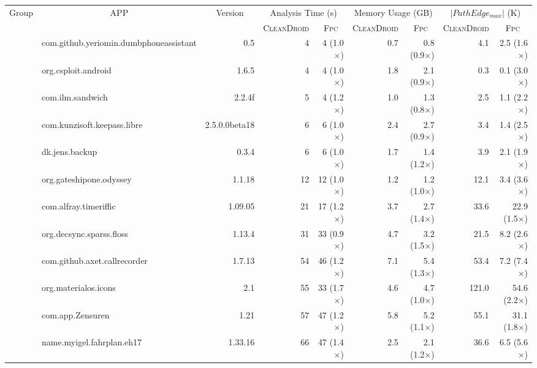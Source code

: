 \documentclass{article}
\begin{document}
\begin{table*}
\begin{adjustbox}{angle=90, max height=\textheight}
\centering
\begin{tabular}{c|l|r|r|r|r|r|r|r} \hline
\multicolumn{1}{c|}{\multirow{2}{*}{Group}} & \multicolumn{1}{|c|}{\multirow{2}{*}{APP}} & \multicolumn{1}{|c|}{\multirow{2}{*}{Version}} & \multicolumn{2}{c|}{Analysis Time (s)} & \multicolumn{2}{c|}{Memory Usage (GB)} & \multicolumn{2}{c}{$|PathEdge_{max}|$ (K)} \\ \cline{4-9}
 & & & \multicolumn{1}{|c|}{\textsc{CleanDroid}} & \multicolumn{1}{|c|}{\textsc{Fpc}} & \multicolumn{1}{|c|}{\textsc{CleanDroid}} & \multicolumn{1}{|c|}{\textsc{Fpc}} & \multicolumn{1}{|c|}{\textsc{CleanDroid}} & \multicolumn{1}{|c}{\textsc{Fpc}} \\ \hline   \hline
& com.github.yeriomin.dumbphoneassistant&0.5&4&4 (1.0$\times$)&0.7&0.8 (0.9$\times$)&4.1&2.5 (1.6$\times$)\\ \cline{2-9}
& org.csploit.android&1.6.5&4&4 (1.0$\times$)&1.8&2.1 (0.9$\times$)&0.3&0.1 (3.0$\times$)\\ \cline{2-9}
& com.ilm.sandwich&2.2.4f&5&4 (1.2$\times$)&1.0&1.3 (0.8$\times$)&2.5&1.1 (2.2$\times$)\\ \cline{2-9}
& com.kunzisoft.keepass.libre&2.5.0.0beta18&6&6 (1.0$\times$)&2.4&2.7 (0.9$\times$)&3.4&1.4 (2.5$\times$)\\ \cline{2-9}
& dk.jens.backup&0.3.4&6&6 (1.0$\times$)&1.7&1.4 (1.2$\times$)&3.9&2.1 (1.9$\times$)\\ \cline{2-9}
& org.gateshipone.odyssey&1.1.18&12&12 (1.0$\times$)&1.2&1.2 (1.0$\times$)&12.1&3.4 (3.6$\times$)\\ \cline{2-9}
& com.alfray.timeriffic&1.09.05&21&17 (1.2$\times$)&3.7&2.7 (1.4$\times$)&33.6&22.9 (1.5$\times$)\\ \cline{2-9}
& org.decsync.sparss.floss&1.13.4&31&33 (0.9$\times$)&4.7&3.2 (1.5$\times$)&21.5&8.2 (2.6$\times$)\\ \cline{2-9}
& com.github.axet.callrecorder&1.7.13&54&46 (1.2$\times$)&7.1&5.4 (1.3$\times$)&53.4&7.2 (7.4$\times$)\\ \cline{2-9}
& org.materialos.icons&2.1&55&33 (1.7$\times$)&4.6&4.7 (1.0$\times$)&121.0&54.6 (2.2$\times$)\\ \cline{2-9}
& com.app.Zensuren&1.21&57&47 (1.2$\times$)&5.8&5.2 (1.1$\times$)&55.1&31.1 (1.8$\times$)\\ \cline{2-9}
& name.myigel.fahrplan.eh17&1.33.16&66&47 (1.4$\times$)&2.5&2.1 (1.2$\times$)&36.6&6.5 (5.6$\times$)\\ \cline{2-9}

\end{tabular}
\end{adjustbox}
\end{table*}
\end{document}
